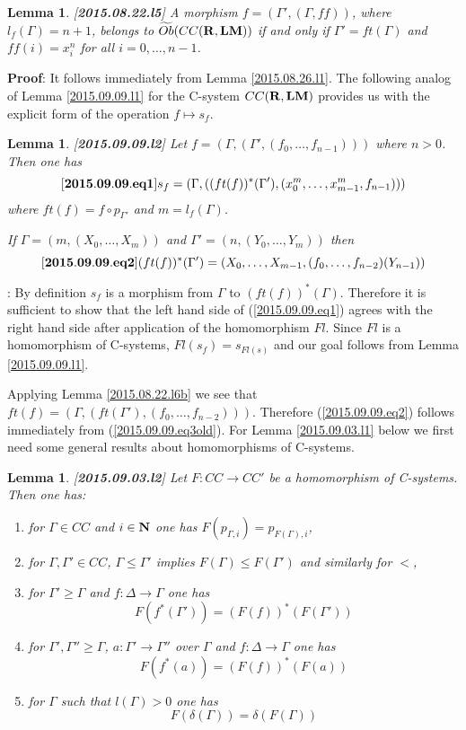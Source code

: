 \documentclass[11pt]{article}
\newenvironment{eq}{\begin{equation}}{\end{equation}}
\newenvironment{proof}{{\bf Proof}:}{\vskip 5mm }
\newtheorem{lemma}[proposition]{Lemma}
\newcommand{\llabel}[1]{\label{#1}[{\bf #1}]}
\newcommand{\sr}{\rightarrow}
\newcommand{\nn}{{\bf N\rm}}
\newcommand{\nat}{\nn}
\newcommand{\rr}{{\bf R}}
\newcommand{\lm}{{\bf LM}}
\newcommand{\wt}{\widetilde}
\begin{document}
%
\begin{lemma}
\llabel{2015.08.22.l5}
A morphism $f=(\Gamma',(\Gamma,ff))$, where $l_f(\Gamma)=n+1$,  belongs to $\wt{Ob}(CC(\rr,\lm))$ if and only if $\Gamma'=ft(\Gamma)$ and $ff(i)=x^n_i$ for all $i=0,\dots,n-1$. 
\end{lemma}
%
\begin{proof}
It follows immediately from Lemma \ref{2015.08.26.l1}.
\end{proof}
%
The following analog of Lemma \ref{2015.09.09.l1} for the C-system $CC(\rr,\lm)$ provides us with the explicit form of the operation $f\mapsto s_f$.
%
\begin{lemma}
\llabel{2015.09.09.l2}
Let $f=(\Gamma,(\Gamma',(f_0,\dots,f_{n-1})))$ where $n>0$. Then one has
%
\begin{eq}\llabel{2015.09.09.eq1}
s_f=(\Gamma,((ft(f))^*(\Gamma'),(x_0^m,\dots,x_{m-1}^m,f_{n-1})))
\end{eq}
%
where $ft(f)=f\circ p_{\Gamma'}$ and $m=l_f(\Gamma)$.

If $\Gamma=(m,(X_0,\dots,X_m))$ and $\Gamma'=(n,(Y_0,\dots,Y_m))$ then
%
\begin{eq}\llabel{2015.09.09.eq2}
(ft(f))^*(\Gamma')=(X_0,\dots,X_{m-1},(f_0,\dots,f_{n-2})(Y_{n-1}))
\end{eq}
%
\end{lemma}
%
\begin{proof}
By definition $s_f$ is a morphism from $\Gamma$ to $(ft(f))^*(\Gamma)$. Therefore it is sufficient to show that the left hand side of (\ref{2015.09.09.eq1}) agrees with the right hand side after application of the homomorphism $Fl$. Since $Fl$ is a homomorphism of C-systems, $Fl(s_f)=s_{Fl(s)}$ and our goal follows from Lemma \ref{2015.09.09.l1}.

Applying Lemma \ref{2015.08.22.l6b} we see that $ft(f)=(\Gamma,(ft(\Gamma'),(f_0,\dots,f_{n-2})))$. Therefore (\ref{2015.09.09.eq2}) follows immediately from (\ref{2015.09.09.eq3old}). 
\end{proof}
%
For Lemma \ref{2015.09.03.l1} below we first need some general results about homomorphisms of C-systems.
%
\begin{lemma}
\llabel{2015.09.03.l2}
Let $F:CC\sr CC'$ be a homomorphism of C-systems. Then one has:
%
\begin{enumerate}
\item for $\Gamma\in CC$ and $i\in\nat$ one has $F(p_{\Gamma,i})=p_{F(\Gamma),i}$,
\item for $\Gamma,\Gamma'\in CC$, $\Gamma\le \Gamma'$ implies $F(\Gamma)\le F(\Gamma')$ and similarly for $<$,
\item for $\Gamma'\ge \Gamma$ and $f:\Delta\sr \Gamma$ one has
%
$$F(f^*(\Gamma'))=(F(f))^*(F(\Gamma'))$$
%
\item for $\Gamma',\Gamma''\ge \Gamma$, $a:\Gamma'\sr \Gamma''$ over $\Gamma$ and $f:\Delta\sr \Gamma$ one has
%
$$F(f^*(a))=(F(f))^*(F(a))$$
%
\item for $\Gamma$ such that $l(\Gamma)>0$ one has
%
$$F(\delta(\Gamma))=\delta(F(\Gamma))$$
%
\end{enumerate}
\end{lemma}
\end{document}

